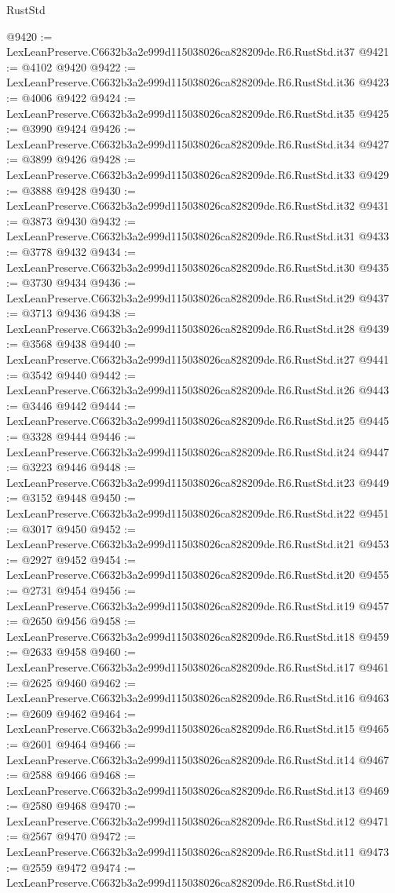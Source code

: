 \begin{lexlean}{RustStd}
\begin{coremodule}
@9420 := LexLeanPreserve.C6632b3a2e999d115038026ca828209de.R6.RustStd.it37
@9421 := @4102 @9420
@9422 := LexLeanPreserve.C6632b3a2e999d115038026ca828209de.R6.RustStd.it36
@9423 := @4006 @9422
@9424 := LexLeanPreserve.C6632b3a2e999d115038026ca828209de.R6.RustStd.it35
@9425 := @3990 @9424
@9426 := LexLeanPreserve.C6632b3a2e999d115038026ca828209de.R6.RustStd.it34
@9427 := @3899 @9426
@9428 := LexLeanPreserve.C6632b3a2e999d115038026ca828209de.R6.RustStd.it33
@9429 := @3888 @9428
@9430 := LexLeanPreserve.C6632b3a2e999d115038026ca828209de.R6.RustStd.it32
@9431 := @3873 @9430
@9432 := LexLeanPreserve.C6632b3a2e999d115038026ca828209de.R6.RustStd.it31
@9433 := @3778 @9432
@9434 := LexLeanPreserve.C6632b3a2e999d115038026ca828209de.R6.RustStd.it30
@9435 := @3730 @9434
@9436 := LexLeanPreserve.C6632b3a2e999d115038026ca828209de.R6.RustStd.it29
@9437 := @3713 @9436
@9438 := LexLeanPreserve.C6632b3a2e999d115038026ca828209de.R6.RustStd.it28
@9439 := @3568 @9438
@9440 := LexLeanPreserve.C6632b3a2e999d115038026ca828209de.R6.RustStd.it27
@9441 := @3542 @9440
@9442 := LexLeanPreserve.C6632b3a2e999d115038026ca828209de.R6.RustStd.it26
@9443 := @3446 @9442
@9444 := LexLeanPreserve.C6632b3a2e999d115038026ca828209de.R6.RustStd.it25
@9445 := @3328 @9444
@9446 := LexLeanPreserve.C6632b3a2e999d115038026ca828209de.R6.RustStd.it24
@9447 := @3223 @9446
@9448 := LexLeanPreserve.C6632b3a2e999d115038026ca828209de.R6.RustStd.it23
@9449 := @3152 @9448
@9450 := LexLeanPreserve.C6632b3a2e999d115038026ca828209de.R6.RustStd.it22
@9451 := @3017 @9450
@9452 := LexLeanPreserve.C6632b3a2e999d115038026ca828209de.R6.RustStd.it21
@9453 := @2927 @9452
@9454 := LexLeanPreserve.C6632b3a2e999d115038026ca828209de.R6.RustStd.it20
@9455 := @2731 @9454
@9456 := LexLeanPreserve.C6632b3a2e999d115038026ca828209de.R6.RustStd.it19
@9457 := @2650 @9456
@9458 := LexLeanPreserve.C6632b3a2e999d115038026ca828209de.R6.RustStd.it18
@9459 := @2633 @9458
@9460 := LexLeanPreserve.C6632b3a2e999d115038026ca828209de.R6.RustStd.it17
@9461 := @2625 @9460
@9462 := LexLeanPreserve.C6632b3a2e999d115038026ca828209de.R6.RustStd.it16
@9463 := @2609 @9462
@9464 := LexLeanPreserve.C6632b3a2e999d115038026ca828209de.R6.RustStd.it15
@9465 := @2601 @9464
@9466 := LexLeanPreserve.C6632b3a2e999d115038026ca828209de.R6.RustStd.it14
@9467 := @2588 @9466
@9468 := LexLeanPreserve.C6632b3a2e999d115038026ca828209de.R6.RustStd.it13
@9469 := @2580 @9468
@9470 := LexLeanPreserve.C6632b3a2e999d115038026ca828209de.R6.RustStd.it12
@9471 := @2567 @9470
@9472 := LexLeanPreserve.C6632b3a2e999d115038026ca828209de.R6.RustStd.it11
@9473 := @2559 @9472
@9474 := LexLeanPreserve.C6632b3a2e999d115038026ca828209de.R6.RustStd.it10

\end{coremodule}
\end{lexlean}
